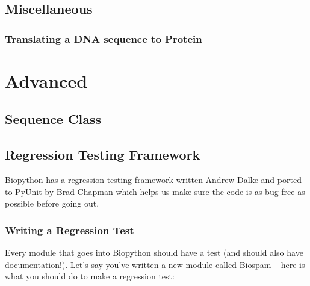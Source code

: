 \documentclass{report}
\begin{document}
\section{Miscellaneous}

\subsection{Translating a DNA sequence to Protein}

\chapter{Advanced}

\section{Sequence Class}

\section{Regression Testing Framework}
\label{sec:regr_test}

Biopython has a regression testing framework written Andrew Dalke and ported to PyUnit by Brad Chapman which helps us make sure the code is as bug-free as possible before going out.

\subsection{Writing a Regression Test}

Every module that goes into Biopython should have a test (and should also have documentation!). Let's say you've written a new module called Biospam -- here is what you should do to make a regression test:
\end{document}
